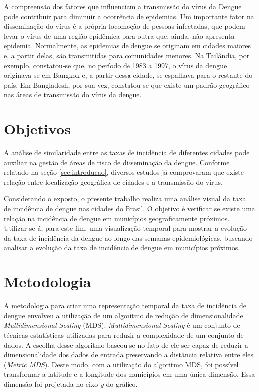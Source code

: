 \documentclass[12pt,openright,twoside,a4paper,article,brazil]{abntex2}
\begin{document}
A compreensão dos fatores que influenciam a transmissão do vírus da Dengue pode contribuir para diminuir a ocorrência de epidemias. Um importante fator na disseminação do vírus é a própria locomoção de pessoas infectadas, que podem levar o vírus de uma região epidêmica para outra que, ainda, não apresenta epidemia. Normalmente, as epidemias de dengue se originam em cidades maiores e, a partir delas, são transmitidas para comunidades menores\cite{cities-spawn-dengue}. Na Tailândia, por exemplo, constatou-se que, no período de 1983 a 1997, o vírus da dengue originava-se em Bangkok e, a partir dessa cidade, se espalhava para o restante do país\cite{travelling-dengue-thailand}. Em Bangladesh, por sua vez, constatou-se que existe um padrão geográfico nas áreas de transmissão do vírus da dengue\cite{dengue-geographic-information-system}.




\section{Objetivos}
\label{sec:objetivos}

A análise de similaridade entre as taxas de incidência de diferentes cidades pode auxiliar na gestão de áreas de risco de disseminação da dengue. Conforme relatado na seção \ref{sec:introducao}, diversos estudos já comprovaram que existe relação entre localização geográfica de cidades e a transmissão do vírus\cite{cities-spawn-dengue}\cite{travelling-dengue-thailand}\cite{dengue-geographic-information-system}.

Considerando o exposto, o presente trabalho realiza uma análise visual da taxa de incidência de dengue nas cidades do Brasil. O objetivo é verificar se existe uma relação na incidência de dengue em municípios geograficamente próximos. Utilizar-se-á, para este fim, uma visualização temporal para mostrar a evolução da taxa de incidência da dengue ao longo das semanas epidemiológicas, buscando analisar a evolução da taxa de incidência de dengue em municípios próximos.


\section{Metodologia}
\label{sec:metodologia}

A metodologia para criar uma representação temporal da taxa de incidência de dengue envolveu a utilização de um algoritmo de redução de dimensionalidade \emph{Multidimensional Scaling} (MDS)\cite{sklearn-mds}. \emph{Multidimensional Scaling} é um conjunto de técnicas estatísticas utilizadas para reduzir a complexidade de um conjunto de dados\cite{multidimensional-scaling-book}. A escolha desse algoritmo baseou-se no fato de ele ser capaz de reduzir a dimensionalidade dos dados de entrada preservando a distância relativa entre eles (\emph{Metric MDS}). Deste modo, com a utilização do algoritmo MDS, foi possível transformar a latitude e a longitude dos municípios em uma única dimensão. Essa dimensão foi projetada no eixo \emph{y} do gráfico.
\end{document}
